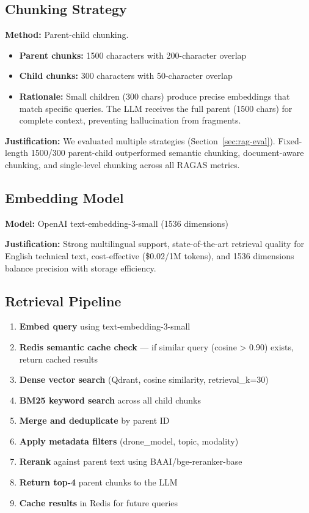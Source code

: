 \documentclass[12pt,a4paper]{article}
\begin{document}
\subsection{Chunking Strategy}

\textbf{Method:} Parent-child chunking.

\begin{itemize}
  \item \textbf{Parent chunks:} 1500 characters with 200-character overlap
  \item \textbf{Child chunks:} 300 characters with 50-character overlap
  \item \textbf{Rationale:} Small children (300 chars) produce precise embeddings that match specific queries. The LLM receives the full parent (1500 chars) for complete context, preventing hallucination from fragments.
\end{itemize}

\textbf{Justification:} We evaluated multiple strategies (Section~\ref{sec:rag-eval}). Fixed-length 1500/300 parent-child outperformed semantic chunking, document-aware chunking, and single-level chunking across all RAGAS metrics.

\subsection{Embedding Model}

\textbf{Model:} OpenAI text-embedding-3-small (1536 dimensions)

\textbf{Justification:} Strong multilingual support, state-of-the-art retrieval quality for English technical text, cost-effective (\$0.02/1M tokens), and 1536 dimensions balance precision with storage efficiency.

\subsection{Retrieval Pipeline}

\begin{enumerate}
  \item \textbf{Embed query} using text-embedding-3-small
  \item \textbf{Redis semantic cache check} — if similar query (cosine > 0.90) exists, return cached results
  \item \textbf{Dense vector search} (Qdrant, cosine similarity, retrieval\_k=30)
  \item \textbf{BM25 keyword search} across all child chunks
  \item \textbf{Merge and deduplicate} by parent ID
  \item \textbf{Apply metadata filters} (drone\_model, topic, modality)
  \item \textbf{Rerank} against parent text using BAAI/bge-reranker-base
  \item \textbf{Return top-4} parent chunks to the LLM
  \item \textbf{Cache results} in Redis for future queries
\end{enumerate}
\end{document}
